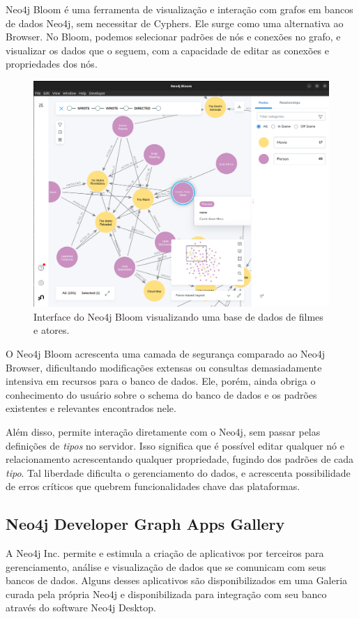 Neo4j Bloom é uma ferramenta de visualização e interação com grafos em bancos de dados Neo4j, sem necessitar de Cyphers. Ele surge como uma alternativa ao Browser. No Bloom, podemos selecionar padrões de nós e conexões no grafo, e visualizar os dados que o seguem, com a capacidade de editar as conexões e propriedades dos nós.

\begin{figure}
    \centering
    \includegraphics[width=0.8\linewidth]{Imagens/chap02/neo4j-bloom.png}
    \caption{Interface do Neo4j Bloom visualizando uma base de dados de filmes e atores.}
    \label{fig:neo4j-bloom}
\end{figure}

O Neo4j Bloom acrescenta uma camada de segurança comparado ao Neo4j Browser, dificultando modificações extensas ou consultas demasiadamente intensiva em recursos para o banco de dados. Ele, porém, ainda obriga o conhecimento do usuário sobre o schema do banco de dados e os padrões existentes e relevantes encontrados nele.

Além disso, permite interação diretamente com o Neo4j, sem passar pelas definições de \textit{tipos} no servidor. Isso significa que é possível editar qualquer nó e relacionamento acrescentando qualquer propriedade, fugindo dos padrões de cada \textit{tipo}. Tal liberdade dificulta o gerenciamento do dados, e acrescenta possibilidade de erros críticos que quebrem funcionalidades chave das plataformas.

\subsection{Neo4j Developer Graph Apps Gallery}

A Neo4j Inc. permite e estimula a criação de aplicativos por terceiros para gerenciamento, análise e visualização de dados que se comunicam com seus bancos de dados. Alguns desses aplicativos são disponibilizados em uma Galeria curada pela própria Neo4j e disponibilizada para integração com seu banco através do software Neo4j Desktop. 

